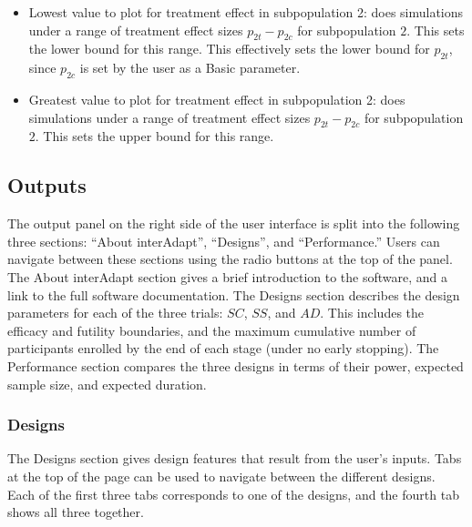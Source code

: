 \documentclass[article]{jss}
\begin{document}
\begin{itemize}
\item Lowest value to plot for treatment effect in subpopulation 2:  does simulations under a range of treatment effect sizes $p_{2t}-p_{2c}$ for subpopulation $2$. This sets the lower bound for this range. This effectively sets the lower bound for $p_{2t}$, since $p_{2c}$ is set by the user as a Basic parameter.

\item Greatest value to plot for treatment effect in subpopulation 2:  does simulations under a range of treatment effect sizes $p_{2t}-p_{2c}$ for subpopulation $2$. This sets the upper bound for this range.


\end{itemize}

\subsection{Outputs}
\label{sub:outputs}

The output panel on the right side of the user interface is split into the following three sections: ``About interAdapt'', ``Designs'', and ``Performance.'' Users can navigate between these sections using the radio buttons at the top of the panel. The About interAdapt section gives a brief introduction to the software, and a link to the full software documentation. The Designs section describes the design parameters for each of the three trials: $SC$, $SS$, and $AD$. This includes the efficacy and futility boundaries, and the maximum cumulative number of participants enrolled by the end of each stage (under no early stopping). The Performance section compares the three designs in terms of their power, expected sample size, and expected duration. 

\subsubsection{Designs}
\label{sub:design}

The Designs section gives design features that result from the user's inputs. Tabs at the top of the page can be used to navigate between the different designs. Each of the first three tabs  corresponds to one of the designs, and the fourth tab shows all three together.
\end{document}
